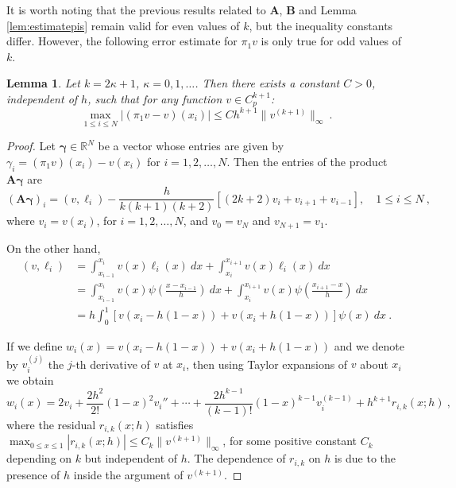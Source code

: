 \documentclass{amsart}
\newcommand{\bA}{\mathbf{A}}
\newcommand{\bB}{\mathbf{B}}
\newcommand{\bgamma}{\boldsymbol{\gamma}}
\newtheorem{lemma}{Lemma}[section]
\begin{document}
It is worth noting that the previous results related to $\bA$, $\bB$ and Lemma \ref{lem:estimatepis} remain valid for even values of $k$, but the inequality constants differ. However, the following error estimate for $\pi_1v$ is only true for odd values of $k$.

\begin{lemma}\label{lem:errestpi1}
Let $k=2\kappa+1$, $\kappa=0,1,\dots$. Then there exists a constant $C>0$, independent of $h$, such that for any function $v\in C_p^{k+1}$:
\begin{equation}\label{eq:errestpi1}
\max_{1\leq i\leq N}|(\pi_1 v-v)(x_i)|\leq Ch^{k+1}\|v^{(k+1)}\|_\infty\ .
\end{equation}
\end{lemma}
\begin{proof}
Let $\bgamma\in \mathbb{R}^N$ be a vector whose entries are given by $\gamma_i=(\pi_1v)(x_i)-v(x_i)$ for $i=1,2,\dots,N$. Then the entries of the  product $\bA\bgamma$ are
\begin{equation}\label{eq:gammai1}
(\bA\bgamma)_i=(v,\ell_i)-\frac{h}{k(k+1)(k+2)}[(2k+2)v_i+v_{i+1}+v_{i-1}], \quad 1\leq i \leq N\ ,
\end{equation}
where $v_i=v(x_i)$, for $i=1,2,\dots, N$, and $v_0=v_N$ and $v_{N+1}=v_1$.

On the other hand, 
$$\begin{aligned}
(v,\ell_i) &=\int_{x_{i-1}}^{x_i} v(x)\ell_i(x)~dx+\int_{x_i}^{x_{i+1}}v(x)\ell_i(x)~dx\\
&=\int_{x_{i-1}}^{x_i} v(x)\psi\left(\frac{x-x_{i-1}}{h}\right)~dx+\int_{x_i}^{x_{i+1}}v(x)\psi\left(\frac{x_{i+1}-x}{h}\right)~dx\\
&= h\int_0^1 \left[ v(x_i-h(1-x))+v(x_i+h(1-x)) \right]\psi(x)~dx\ .
\end{aligned}$$

If we define $w_i(x)=v(x_i-h(1-x))+v(x_i+h(1-x))$ and we denote by $v_i^{(j)}$ the $j$-th derivative of $v$ at $x_i$, then using Taylor expansions of $v$ about $x_i$ we obtain
$$w_i(x)=2v_i+\frac{2h^2}{2!}(1-x)^2v_i''+\cdots + \frac{2h^{k-1}}{(k-1)!}(1-x)^{k-1}v_i^{(k-1)}+h^{k+1} r_{i,k}(x;h)\ ,$$
where the residual $r_{i,k}(x;h)$ satisfies $\max_{0\leq x\leq 1}|r_{i,k}(x;h)|\leq C_k\|v^{(k+1)}\|_\infty$, for some positive constant $C_k$ depending on $k$ but independent of $h$. The dependence of $r_{i,k}$ on $h$ is due to the presence of $h$ inside the argument of $v^{(k+1)}$.


\end{proof}
\end{document}

